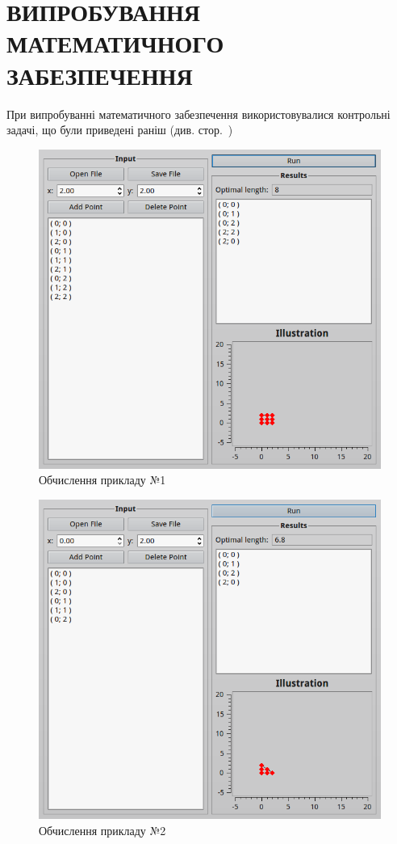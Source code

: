 \documentclass[simple,14pt,utf8,ukrainian]{eskdtext}
\begin{document}
\section{ВИПРОБУВАННЯ МАТЕМАТИЧНОГО ЗАБЕЗПЕЧЕННЯ}
  При випробуванні математичного забезпечення використовувалися контрольні
  задачі, що були приведені раніш (див. стор.~\pageref{ssec:ex})
  \begin{figure}[h]
    \centering
    \includegraphics[scale=0.7]{scr2.png}
    \caption{Обчислення прикладу №1}
    \label{fig:ex1}
  \end{figure}

  \begin{figure}[h]
    \centering
    \includegraphics[scale=0.7]{scr3.png}
    \caption{Обчислення прикладу №2}
    \label{fig:ex2}
  \end{figure}
\end{document}
